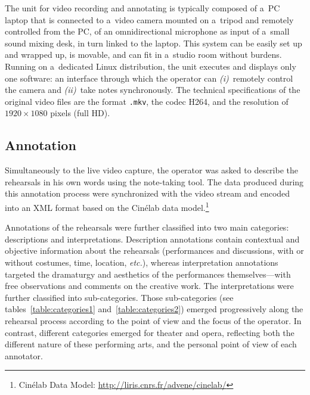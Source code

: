 \documentclass[conference]{IEEEtran}
\newcommand{\todo}[1]{\noindent\textcolor{red}{{\bf \{ToDo} #1{\bf \}}}}
\begin{document}
The unit for video recording and annotating is typically composed of a~PC laptop that is connected to a~video camera mounted on a~tripod and remotely controlled from the PC, of an omnidirectional microphone as input of a~small sound mixing desk, in turn linked to the laptop. This system can be easily set up and wrapped up, is movable, and can fit in a~studio room without burdens. Running on a~dedicated Linux distribution, the unit executes and displays only one software: an interface through which the operator can \emph{(i)}~remotely control the camera and \emph{(ii)}~take notes synchronously. 
The technical specifications of the original video files are the format \texttt{.mkv}, the codec H264, and the resolution of $1920 \times 1080$ pixels (full HD).


\subsection{Annotation}
Simultaneously to the live video capture, the operator was asked to describe the rehearsals in his own words using  the note-taking tool. The data produced during this annotation process were synchronized with the video stream and encoded into an XML format based on the Cinélab data model.\footnote{Cinélab Data Model: \url{http://liris.cnrs.fr/advene/cinelab/}}

Annotations of the  rehearsals were further classified  into two main categories: descriptions and interpretations.  Description annotations contain contextual and objective information about the rehearsals  (performances and  discussions, with or without costumes, time, location, \emph{etc.}), whereas interpretation annotations targeted the dramaturgy and aesthetics of the performances themselves---with free observations and comments on the creative work. The interpretations were further classified into sub-categories. Those sub-categories (see tables~\ref{table:categories1} and~\ref{table:categories2}) emerged progressively along the rehearsal process according to the point of view and the focus of the operator. 
In contrast, different categories emerged for theater and opera, reflecting both the different nature of these performing arts, and the personal point of view of each annotator.
\end{document}

